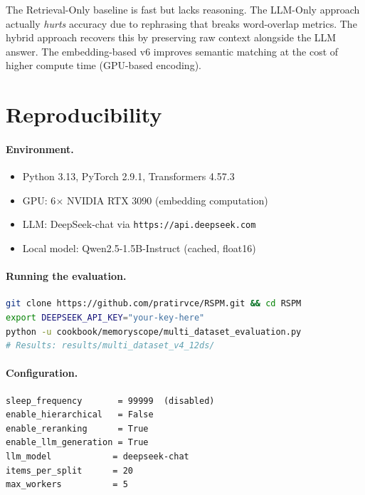 \documentclass[11pt,a4paper]{article}
\begin{document}
The Retrieval-Only baseline is fast but lacks reasoning.  The LLM-Only
approach actually \emph{hurts} accuracy due to rephrasing that breaks
word-overlap metrics.  The hybrid approach recovers this by preserving raw
context alongside the LLM answer.  The embedding-based v6 improves semantic
matching at the cost of higher compute time (GPU-based encoding).


\section{Reproducibility}
\label{sec:repro}

\paragraph{Environment.}
\begin{itemize}[nosep]
    \item Python 3.13, PyTorch 2.9.1, Transformers 4.57.3
    \item GPU: 6$\times$ NVIDIA RTX 3090 (embedding computation)
    \item LLM: DeepSeek-chat via \texttt{https://api.deepseek.com}
    \item Local model: Qwen2.5-1.5B-Instruct (cached, float16)
\end{itemize}

\paragraph{Running the evaluation.}
\begin{lstlisting}[language=bash]
git clone https://github.com/pratirvce/RSPM.git && cd RSPM
export DEEPSEEK_API_KEY="your-key-here"
python -u cookbook/memoryscope/multi_dataset_evaluation.py
# Results: results/multi_dataset_v4_12ds/
\end{lstlisting}

\paragraph{Configuration.}
\begin{lstlisting}
sleep_frequency       = 99999  (disabled)
enable_hierarchical   = False
enable_reranking      = True
enable_llm_generation = True
llm_model            = deepseek-chat
items_per_split      = 20
max_workers          = 5
\end{lstlisting}
\end{document}
